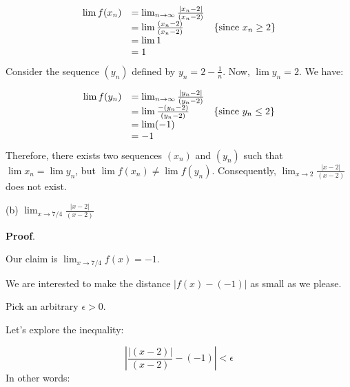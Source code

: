 \documentclass[10pt]{article}
\begin{document}
\begin{equation*}
\begin{array}{ c l c }
\lim f( x_{n}) & =\lim _{n\rightarrow \infty }\frac{|x_{n} -2|}{( x_{n} -2)} & \\
 & =\lim \frac{( x_{n} -2)}{( x_{n} -2)} & \left\{\text{since} \ x_{n} \geq 2\right\}\\
 & =\lim 1 & \\
 & =1 & 
\end{array}
\end{equation*}
Consider the sequence $\displaystyle ( y_{n})$ defined by $\displaystyle y_{n} =2-\frac{1}{n}$. Now, $\displaystyle \lim y_{n} =2$. We have:


\begin{equation*}
\begin{array}{ r l c }
\lim f( y_{n}) & =\lim _{n\rightarrow \infty }\frac{|y_{n} -2|}{( y_{n} -2)} & \\
 & =\lim \frac{-( y_{n} -2)}{( y_{n} -2)} & \left\{\text{since } y_{n} \leq 2\right\}\\
 & =\lim ( -1) & \\
 & =-1 & 
\end{array}
\end{equation*}
Therefore, there exists two sequences $\displaystyle ( x_{n})$ and $\displaystyle ( y_{n})$ such that $\displaystyle \lim x_{n} =\lim y_{n}$, but $\displaystyle \lim f( x_{n}) \neq \lim f( y_{n})$. Consequently, $\displaystyle \lim _{x\rightarrow 2}\frac{|x-2|}{( x-2)}$ does not exist.



(b) $\displaystyle \lim _{x\rightarrow 7/4}\frac{|x-2|}{( x-2)}$



\textbf{Proof}.



Our claim is $\displaystyle \lim _{x\rightarrow 7/4} f( x) =-1$.



We are interested to make the distance $\displaystyle |f( x) -( -1) |$ as small as we please. 



Pick an arbitrary $\displaystyle \epsilon  >0$. 



Let's explore the inequality:


\begin{equation*}
\left| \frac{|( x-2) |}{( x-2)} -( -1)\right| < \epsilon 
\end{equation*}
In other words:
\end{document}

